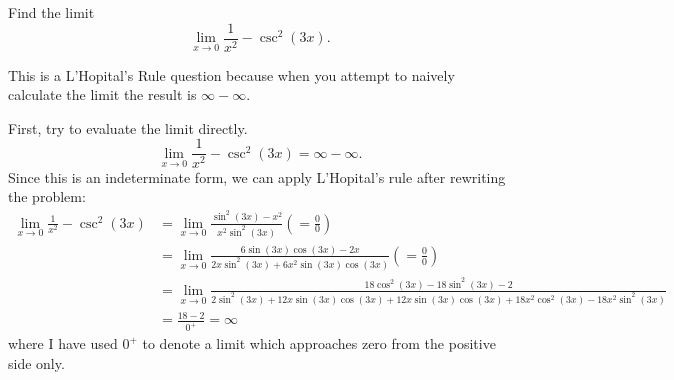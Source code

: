\documentclass{ximera}
\author{Emma Smith Zbarsky}
\begin{document}
\begin{exercise}

Find the limit \[\lim_{x \to 0} \frac{1}{x^2}- \csc^2(3x).\]


\begin{hint}
This is a L'Hopital's Rule question because when you attempt to naively
calculate the limit the result is $\infty-\infty$.
\end{hint}


\begin{hint}
First, try to evaluate the limit directly.
\[\lim_{x\to 0} \frac{1}{x^2} - \csc^2(3x) = \infty-\infty.\] Since this
is an indeterminate form, we can apply L'Hopital's rule after rewriting
the problem: \begin{align*}
\lim_{x\to 0} \frac{1}{x^2}-\csc^2(3x) &= \lim_{x\to 0} \frac{\sin^2(3x)-x^2}{x^2\sin^2(3x)} \left( = \frac{0}{0}\right)\\
&=  \lim_{x\to 0} \frac{6\sin(3x)\cos(3x)-2x}{2x\sin^2(3x)+6x^2\sin(3x)\cos(3x)} \left( =\frac{0}{0}\right) \\
&= \lim_{x\to 0} \frac{18\cos^2(3x)-18\sin^2(3x)-2}{2\sin^2(3x)+12x\sin(3x)\cos(3x)+12x\sin(3x)\cos(3x) + 18x^2\cos^2(3x)-18x^2\sin^2(3x)} \\
&= \frac{18-2}{0^+} = \infty
\end{align*} where I have used $0^+$ to denote a limit which
approaches zero from the positive side only.
\end{hint}


\begin{multipleChoice}
\choice{$-\infty$}
\choice[correct]{$\infty$}
\end{multipleChoice}

\end{exercise}
\end{document}
